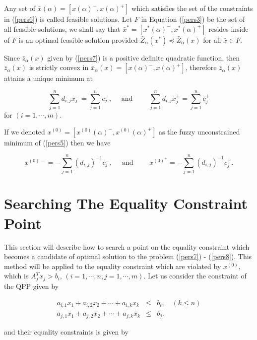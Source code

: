\documentclass{iaesarticle3}
\begin{document}
Any set of $\bar x(\alpha) = [x(\alpha)^-, x(\alpha)^+]$ which satisfies the set of the constraints in (\ref{pers6}) is called feasible solutions. Let $F$ in Equation (\ref{pers3}) be the set of all feasible solutions, we shall say that $\bar x^* = [x^*(\alpha)^-, x^*(\alpha)^+]$ resides inside of $F$ is an optimal feasible solution provided $\bar Z_\alpha(x^*) \preceq \bar Z_\alpha(x)$ for all $\bar x\in F$.

Since $\bar z_\alpha(x)$ given by (\ref{pers7}) is a positive definite quadratic function, then $\bar z_\alpha(x)$ is strictly convex in $\bar x_\alpha(x) = [x(\alpha)^-, x(\alpha)^+]$, therefore $\bar z_\alpha(x)$ attains a unique minimum at

\begin{equation}\label{pers6a}
    \sum_{j=1}^n d_{i,j}x_j^- = \sum_{j=1}^nc_j^-, \quad \text{ and } \qquad \sum_{j=1}^n d_{i,j}x_j^+ = \sum_{j=1}^nc_j^+
\end{equation}
for $(i=1,\cdots, m)$.


If we denoted $x^{(0)} = [x^{(0)}(\alpha)^-, x^{(0)}(\alpha)^+]$ as the fuzzy unconstrained minimum of (\ref{pers5}) then we have

\begin{equation}\label{pers6b}
    x^{(0)-} = -\sum_{j=1}^n(d_{i,j})^{-1}c_j^-, \quad \text{ and } \qquad x^{(0)^+} = -\sum_{j=1}^n(d_{i,j})^{-1}c_j^+.
\end{equation}


\section{Searching The Equality Constraint Point} \label{equality}
This section will describe how to search a point on the equality constraint which becomes a candidate of optimal solution to the problem (\ref{pers7}) - (\ref{pers8}). This method will be applied to the equality constraint which are violated by $x^{(0)}$, which is $A^T_jx_j > b_i$, $(i=1,\cdots, n, j=1,\cdots, m)$. Let us consider the constraint of the QPP given by

\begin{eqnarray}\label{eqn1}
  a_{i,1}x_1 + a_{i,2}x_2 + \cdots + a_{i,k}x_k &\leq& b_i, \quad (k\leq n) \\
  \label{eqn2}
  a_{j,1}x_1 + a_{j,2}x_2 + \cdots + a_{j,k}x_k &\leq& b_j.
\end{eqnarray}


\noindent and their equality constraints is given by
\end{document}
